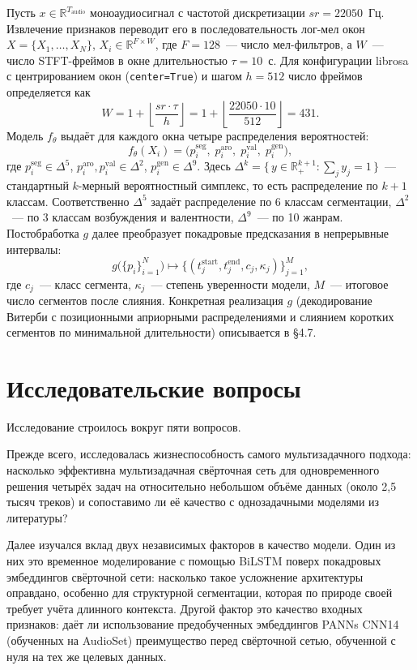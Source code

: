 Пусть $x \in \mathbb{R}^{T_{\text{audio}}}$ моноаудиосигнал с частотой дискретизации $sr = 22050$~Гц. Извлечение признаков переводит его в последовательность лог-мел окон $X = \{X_1, \dots, X_N\}$, $X_i \in \mathbb{R}^{F \times W}$, где $F = 128$~--- число мел-фильтров, а $W$~--- число STFT-фреймов в окне длительностью $\tau = 10$~с. Для конфигурации librosa с центрированием окон (\texttt{center=True}) и шагом $h = 512$ число фреймов определяется как
\[
W = 1 + \left\lfloor \frac{sr \cdot \tau}{h} \right\rfloor = 1 + \left\lfloor \frac{22050 \cdot 10}{512} \right\rfloor = 431.
\]
Модель $f_\theta$ выдаёт для каждого окна четыре распределения вероятностей:
\[
f_\theta(X_i) = \big( p^{\text{seg}}_i, \; p^{\text{aro}}_i, \; p^{\text{val}}_i, \; p^{\text{gen}}_i \big),
\]
где $p^{\text{seg}}_i \in \Delta^5$, $p^{\text{aro}}_i, p^{\text{val}}_i \in \Delta^2$, $p^{\text{gen}}_i \in \Delta^9$. Здесь $\Delta^{k} = \{\, y \in \mathbb{R}^{k+1}_{+} : \sum_j y_j = 1 \,\}$~--- стандартный $k$-мерный вероятностный симплекс, то есть распределение по $k+1$ классам. Соответственно $\Delta^5$ задаёт распределение по 6 классам сегментации, $\Delta^2$~--- по 3 классам возбуждения и валентности, $\Delta^9$~--- по 10 жанрам. Постобработка $g$ далее преобразует покадровые предсказания в непрерывные интервалы:
\[
g\big( \{p_i\}_{i=1}^N \big) \mapsto \{ (t_j^{\text{start}}, t_j^{\text{end}}, c_j, \kappa_j) \}_{j=1}^M,
\]
где $c_j$~--- класс сегмента, $\kappa_j$~--- степень уверенности модели, $M$~--- итоговое число сегментов после слияния. Конкретная реализация $g$ (декодирование Витерби с позиционными априорными распределениями и слиянием коротких сегментов по минимальной длительности) описывается в §4.7.

\section{Исследовательские вопросы}\label{sec:2-2}

Исследование строилось вокруг пяти вопросов.

Прежде всего, исследовалась жизнеспособность самого мультизадачного подхода: насколько эффективна мультизадачная свёрточная сеть для одновременного решения четырёх задач на относительно небольшом объёме данных (около 2{,}5 тысяч треков) и сопоставимо ли её качество с однозадачными моделями из литературы?

Далее изучался вклад двух независимых факторов в качество модели. Один из них это временное моделирование с помощью BiLSTM поверх покадровых эмбеддингов свёрточной сети: насколько такое усложнение архитектуры оправдано, особенно для структурной сегментации, которая по природе своей требует учёта длинного контекста. Другой фактор это качество входных признаков: даёт ли использование предобученных эмбеддингов PANNs CNN14 (обученных на AudioSet) преимущество перед свёрточной сетью, обученной с нуля на тех же целевых данных.

